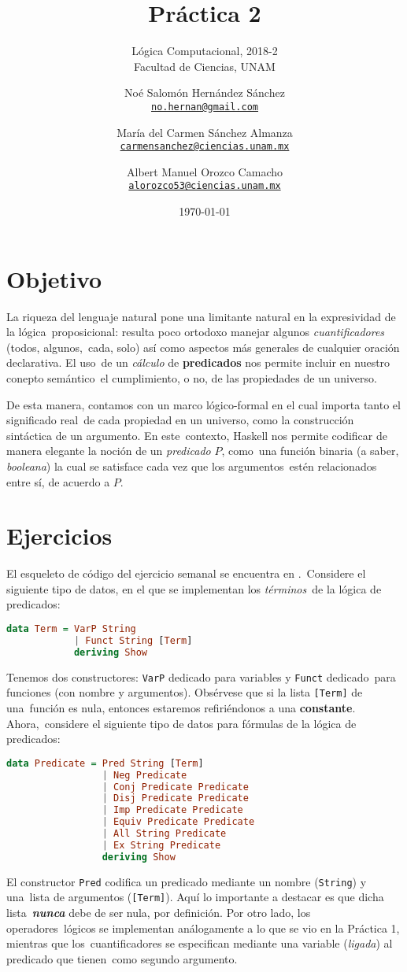 \documentclass[paper=letter, fontsize=12pt]{scrartcl}
\title{Práctica 2}
\subtitle{
  Lógica Computacional, 2018-2\\
  Facultad de Ciencias, UNAM
}
\author{
  \normalsize
  Noé Salomón Hernández Sánchez\\
  \normalsize
  \texttt{\href{mailto:no.hernan@gmail.com}{no.hernan@gmail.com}}
  \and
  \normalsize
  María del Carmen Sánchez Almanza\\
  \normalsize
  \texttt{\href{mailto:carmensanchez@ciencias.unam.mx}{carmensanchez@ciencias.unam.mx}}
  \and
  \normalsize
  Albert Manuel Orozco Camacho\\
  \normalsize
  \texttt{\href{mailto:alorozco53@ciencias.unam.mx}{alorozco53@ciencias.unam.mx}}
}
\date{\today}
\begin{document}
\maketitle

\section{Objetivo}

\noindent
La riqueza del lenguaje natural pone una limitante natural en la expresividad de la lógica\
proposicional: resulta poco ortodoxo manejar algunos \emph{cuantificadores} (todos, algunos,\
cada, solo) así como aspectos más generales de cualquier oración declarativa. El uso\
de un \emph{cálculo} de \textbf{predicados} nos permite incluir en nuestro conepto semántico\
el cumplimiento, o no, de las propiedades de un universo.\par
De esta manera, contamos con un marco lógico-formal en el cual importa tanto el significado real\
de cada propiedad en un universo, como la construcción sintáctica de un argumento. En este\
contexto, Haskell nos permite codificar de manera elegante la noción de un \emph{predicado} $P$, como\
una función binaria (a saber, \emph{booleana}) la cual se satisface cada vez que los argumentos\
estén relacionados entre sí, de acuerdo a $P$.

\section{Ejercicios}

\noindent
El esqueleto de código del ejercicio semanal se encuentra en \url{}.\
Considere el siguiente tipo de datos, en el que se implementan los \emph{términos}\
de la lógica de predicados:
\begin{lstlisting}[language=Haskell]
  data Term = VarP String
            | Funct String [Term]
            deriving Show
\end{lstlisting}
Tenemos dos constructores: \verb+VarP+ dedicado para variables y \verb+Funct+ dedicado\
para funciones (con nombre y argumentos). Obsérvese que si la lista \verb+[Term]+ de una\
función es nula, entonces estaremos refiriéndonos a una \textbf{constante}. Ahora,\
considere el siguiente tipo de datos para fórmulas de la lógica de predicados:
\begin{lstlisting}[language=Haskell]
  data Predicate = Pred String [Term]
                 | Neg Predicate
                 | Conj Predicate Predicate
                 | Disj Predicate Predicate
                 | Imp Predicate Predicate
                 | Equiv Predicate Predicate
                 | All String Predicate
                 | Ex String Predicate
                 deriving Show
\end{lstlisting}
El constructor \verb+Pred+ codifica un predicado mediante un nombre (\verb+String+) y una\
lista de argumentos (\verb+[Term]+). Aquí lo importante a destacar es que dicha lista\
\textbf{\textit{nunca}} debe de ser nula, por definición. Por otro lado, los operadores\
lógicos se implementan análogamente a lo que se vio en la Práctica 1, mientras que los\
cuantificadores se especifican mediante una variable (\emph{ligada}) al predicado que tienen\
como segundo argumento.
\end{document}
